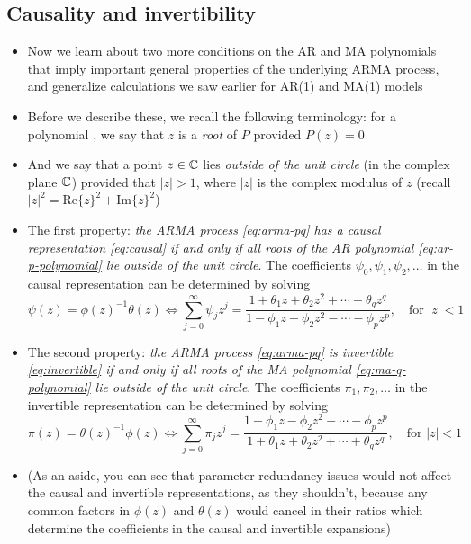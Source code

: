 \documentclass{article}
\begin{document}
\subsection{Causality and invertibility}

\begin{itemize}
\item Now we learn about two more conditions on the AR and MA polynomials that
  imply important general properties of the underlying ARMA process, and
  generalize calculations we saw earlier for AR(1) and MA(1) models

\item Before we describe these, we recall the following terminology: for a
  polynomial , we say that $z$ is a
  \emph{root} of $P$ provided $P(z) = 0$

\item And we say that a point $z \in \mathbb{C}$ lies \emph{outside of the unit circle} 
  (in the complex plane $\mathbb{C}$) provided that $|z| > 1$, where $|z|$ is the
  complex modulus of $z$ (recall $|z|^2 = \mathrm{Re}\{z\}^2 +
  \mathrm{Im}\{z\}^2$)     

\item The first property: \emph{the ARMA process \eqref{eq:arma-pq} has a causal
    representation \eqref{eq:causal} if and only if all roots of the AR
    polynomial \eqref{eq:ar-p-polynomial} lie outside of the unit circle}. The
  coefficients $\psi_0,\psi_1,\psi_2,\dots$ in the causal representation can be
  determined by solving  
  \[
  \psi(z) = \phi(z)^{-1} \theta(z) \iff 
  \sum_{j=0}^\infty \psi_j z^j = \frac{1 + \theta_1 z + \theta_2 z^2 + \cdots +
    \theta_q z^q}{1 - \phi_1 z - \phi_2 z^2 - \cdots - \phi_p z^p}, \quad
  \text{for $|z| < 1$}
  \]

\item The second property: \emph{the ARMA process \eqref{eq:arma-pq} is
    invertible \eqref{eq:invertible} if and only if all roots of the MA
    polynomial \eqref{eq:ma-q-polynomial} lie outside of the unit circle}. The  
  coefficients $\pi_1,\pi_2,\dots$ in the invertible representation can be 
  determined by solving   
  \[
  \pi(z) = \theta(z)^{-1} \phi(z) \iff 
  \sum_{j=0}^\infty \pi_j z^j = \frac{1 - \phi_1 z - \phi_2 z^2 - \cdots -
    \phi_p z^p}{1 + \theta_1 z + \theta_2 z^2 + \cdots + \theta_q z^q}, \quad 
  \text{for $|z| < 1$}
  \]

\item (As an aside, you can see that parameter redundancy issues would not
  affect the causal and invertible representations, as they shouldn't, because
  any common factors in $\phi(z)$ and $\theta(z)$ would cancel in their ratios 
  which determine the coefficients in the causal and invertible expansions)  


\end{itemize}
\end{document}
